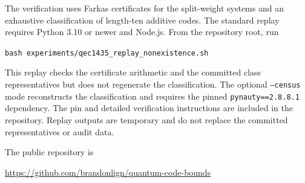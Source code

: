 \documentclass[11pt]{article}
\begin{document}
The verification uses Farkas certificates for the split-weight systems and an exhaustive classification of length-ten additive codes. The standard replay requires Python 3.10 or newer and Node.js. From the repository root, run
\begin{center}
\texttt{bash experiments/qec1435\_replay\_nonexistence.sh}
\end{center}
This replay checks the certificate arithmetic and the committed class representatives but does not regenerate the classification. The optional \texttt{--census} mode reconstructs the classification and requires the pinned \texttt{pynauty==2.8.8.1} dependency. The pin and detailed verification instructions are included in the repository. Replay outputs are temporary and do not replace the committed representatives or audit data.

The public repository is
\begin{center}
\url{https://github.com/brandonlign/quantum-code-bounds}
\end{center}
\end{document}
